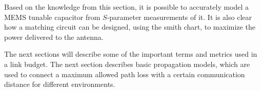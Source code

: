 \begin{aautail}
    Based on the knowledge from this section, it is possible to accurately model a MEMS tunable capacitor from $S$-parameter measurements of it. It is also clear how a matching circuit can be designed, using the smith chart, to maximize the power delivered to the antenna.

    The next sections will describe some of the important terms and metrics used in a link budget. The next section describes basic propagation models, which are used to connect a maximum allowed path loss with a certain communication distance for different environments.

\end{aautail}
